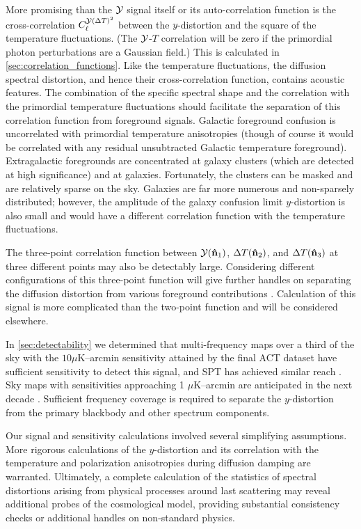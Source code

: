 \documentclass[fleqn,usenatbib]{mnras}
\begin{document}
    More promising than the $\mathcal{Y}$ signal itself or its auto-correlation function
    is the cross-correlation $C_\ell^{\mathcal{Y} ({\Delta T})^2}$ between the
    $y$-distortion and the square of the temperature fluctuations.  
    (The $\mathcal{Y}$-$T$ correlation will be zero if the primordial photon
    perturbations are a Gaussian field.) This is calculated in
    \autoref{sec:correlation_functions}.  Like the temperature fluctuations, the
    diffusion spectral distortion, and hence their cross-correlation function,
    contains acoustic features.  The combination of the specific spectral shape
    and the correlation with the primordial temperature fluctuations should
    facilitate the separation of this correlation function from foreground
    signals.  Galactic foreground confusion is uncorrelated with primordial
    temperature anisotropies (though of course it would be correlated with any
    residual unsubtracted Galactic temperature foreground).  Extragalactic
    foregrounds are concentrated at galaxy clusters (which are detected at high
    significance) and at galaxies.  Fortunately, the clusters can be masked and
    are relatively sparse on the sky.  Galaxies are far more numerous and
    non-sparsely distributed; however, the amplitude of the galaxy confusion
    limit $y$-distortion is also small and would have a different correlation
    function with the temperature fluctuations.

    The three-point correlation function between $\mathcal{Y}({\bf\hat{n}}_1)$,
    ${\Delta T}({\bf\hat{n}}_2)$, and ${\Delta T}({\bf\hat{n}}_3)$ at three different points may
    also be detectably large.  Considering different configurations of this
    three-point function will give further handles on separating the diffusion
    distortion from various foreground contributions \citep{Coulton+2018}.
    Calculation of this signal is more complicated than the two-point function
    and will be considered elsewhere.

    In \autoref{sec:detectability} we determined that multi-frequency maps over
    a third of the sky with the $10\mu$K--arcmin sensitivity attained by the
    final ACT dataset \citep{Coulton+2023} have sufficient sensitivity to
    detect this signal, and SPT has achieved similar reach \citep{SPTymap}.
    Sky maps with sensitivities approaching 1 $\mu$K--arcmin are anticipated in
    the next decade \citep{Abitbol+2017cmbs4}.  Sufficient frequency coverage is
    required to separate the $y$-distortion from the primary blackbody and other
    spectrum components.

    Our signal and sensitivity calculations involved several simplifying
    assumptions.  More rigorous calculations of the $y$-distortion and its
    correlation with the temperature and polarization anisotropies during
    diffusion damping are warranted.  Ultimately, a complete calculation of the
    statistics of spectral distortions arising from physical processes around
    last scattering may reveal additional probes of the cosmological model,
    providing substantial consistency checks or additional handles on
    non-standard physics.
\end{document}
